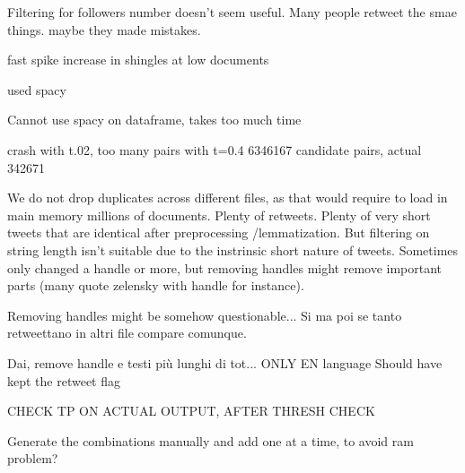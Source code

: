 \documentclass[runningheads]{llncs}
\begin{document}
Filtering for followers number doesn't seem useful. Many people retweet the smae things. maybe they made mistakes.

fast spike increase in shingles at low documents

used spacy 

Cannot use spacy on dataframe, takes too much time

crash with t.02, too many pairs
with t=0.4 6346167 candidate pairs, actual 342671 

We do not drop duplicates across different files, as that would require to load in main memory millions of documents. Plenty of retweets. Plenty of very short tweets that are identical after preprocessing /lemmatization. But filtering on string length isn't suitable due to the instrinsic short nature of tweets.  
Sometimes only changed a handle or more, but removing handles might remove important parts (many quote zelensky with handle for instance).

Removing handles might be somehow questionable... Si ma poi se tanto retweettano in altri file compare comunque.

Dai, remove handle e testi più lunghi di tot...
ONLY EN language
Should have kept the retweet flag


CHECK TP ON ACTUAL OUTPUT, AFTER THRESH CHECK

Generate the combinations manually and add one at a time, to avoid ram problem?



\end{document}
